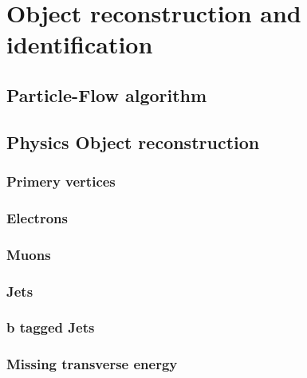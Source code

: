 \chapter{Object reconstruction and identification}
\section{Particle-Flow algorithm}
\section{Physics Object reconstruction}
\subsection{Primery vertices}
\subsection{Electrons}
\subsection{Muons}
\subsection{Jets}
\subsection{b tagged Jets}
\subsection{Missing transverse energy}
\clearpage
